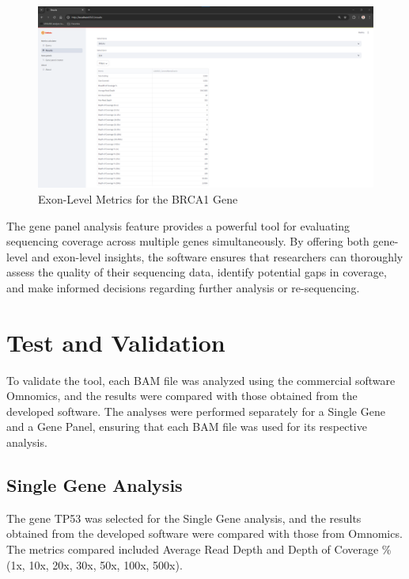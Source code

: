 \begin{itemize}
\begin{figure}[H]
    \centering
    \includegraphics[width=\textwidth]{figs/v3.12.png}
    \caption{Exon-Level Metrics for the BRCA1 Gene}
    \label{fig:exon_results}
\end{figure}

The gene panel analysis feature provides a powerful tool for evaluating sequencing coverage across multiple genes simultaneously. By offering both gene-level and exon-level insights, the software ensures that researchers can thoroughly assess the quality of their sequencing data, identify potential gaps in coverage, and make informed decisions regarding further analysis or re-sequencing.

\end{itemize}

\section{Test and Validation}

To validate the tool, each BAM file was analyzed using the commercial software Omnomics, and the results were compared with those obtained from the developed software. The analyses were performed separately for a Single Gene and a Gene Panel, ensuring that each BAM file was used for its respective analysis.

\subsection{Single Gene Analysis}

The gene TP53 was selected for the Single Gene analysis, and the results obtained from the developed software were compared with those from Omnomics. The metrics compared included Average Read Depth and Depth of Coverage \% (1x, 10x, 20x, 30x, 50x, 100x, 500x).


